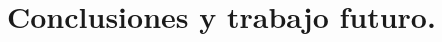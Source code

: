 \documentclass[letterpaper,12pt]{article}
\begin{document}



\newpage
\section{Conclusiones y trabajo futuro.}
\end{document}
